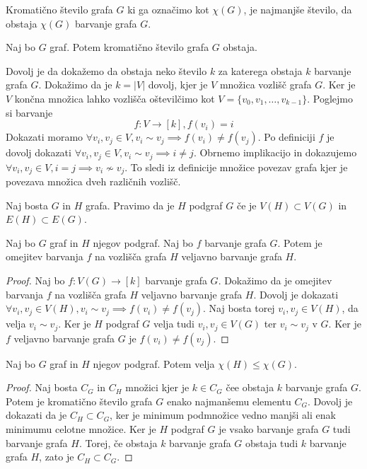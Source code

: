\documentclass[mat1]{fmfdelo}
\begin{document}
\begin{definicija}
    Kromatično število grafa $G$ ki ga označimo kot $\chi(G)$, je najmanjše število, da obstaja $\chi(G)$ barvanje grafa $G$.
\end{definicija} 
\begin{lema}
    Naj bo $G$ graf. Potem kromatično število grafa $G$ obstaja.
\end{lema}
\begin{dokaz}
    Dovolj je da dokažemo da obstaja neko število $k$ za katerega obstaja $k$ barvanje grafa $G$.
    Dokažimo da je $k=|V|$ dovolj, kjer je $V$ množica vozlišč grafa $G$. Ker je $V$ končna množica
    lahko vozlišča oštevilčimo kot $V = \{v_0, v_1, \dots, v_{k-1}\}$. Poglejmo si barvanje 
    \[ f:V \to [k], f(v_i) = i\]
    Dokazati moramo $\forall v_i, v_j \in V, v_i \sim v_j\implies f(v_i)\neq f(v_j)$. Po definiciji $f$ je dovolj dokazati
    $\forall v_i, v_j \in V, v_i \sim v_j\implies i\neq j$. Obrnemo implikacijo in dokazujemo $\forall v_i, v_j \in V, i=j \implies
    v_i \nsim v_j$. To sledi iz definicije množice povezav grafa kjer je povezava množica dveh različnih vozlišč. 
\end{dokaz}

\begin{definicija}
Naj bosta $G$ in $H$ grafa. Pravimo da je $H$ podgraf $G$ če je $V(H)\subset V(G)$ in $E(H)\subset E(G)$.
\end{definicija}
\begin{lema}
    Naj bo $G$ graf in $H$ njegov podgraf. Naj bo $f$ barvanje grafa $G$. Potem je omejitev barvanja $f$ na vozlišča
    grafa $H$ veljavno barvanje grafa $H$.
\end{lema}
\begin{proof}
Naj bo $f:V(G)\to [k]$ barvanje grafa $G$. Dokažimo da je omejitev barvanja $f$ na vozlišča grafa $H$ veljavno barvanje grafa $H$.
Dovolj je dokazati $\forall v_i, v_j \in V(H), v_i \sim v_j\implies f(v_i)\neq f(v_j)$. Naj bosta torej $v_i, v_j \in V(H)$, 
da velja $v_i \sim v_j$. Ker je $H$ podgraf $G$ velja tudi $v_i, v_j \in V(G)$ ter $v_i \sim v_j$ v $G$. Ker je $f$ veljavno barvanje
grafa $G$ je $f(v_i)\neq f(v_j)$.
\end{proof}


\begin{lema}
    Naj bo $G$ graf in $H$ njegov podgraf. Potem velja $\chi(H)\leq \chi(G)$.
\end{lema}
\begin{proof}
    Naj bosta $C_G$ in $C_H$ množici kjer je $k\in C_G$ čee obstaja $k$ barvanje grafa $G$. Potem je kromatično število
    grafa $G$ enako najmanšemu elementu $C_G$. Dovolj je dokazati da je $C_H\subset C_G$, ker je minimum podmnožice vedno
    manjši ali enak minimumu celotne množice. Ker je $H$ podgraf $G$ je vsako barvanje grafa $G$ tudi barvanje grafa $H$.
    Torej, če obstaja $k$ barvanje grafa $G$ obstaja tudi $k$ barvanje grafa $H$, zato je $C_H\subset C_G$.
\end{proof}
\end{document}
